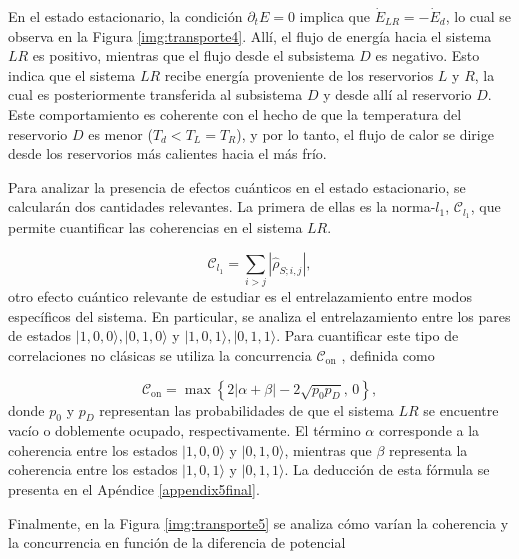En el estado estacionario, la condición \( \partial_t E = 0 \) implica que \( \dot{E}_{LR} = -\dot{E}_d \), lo cual se observa en la Figura \ref{img:transporte4}. Allí, el flujo de energía hacia el sistema \( LR \) es positivo, mientras que el flujo desde el subsistema \( D \) es negativo. Esto indica que el sistema \( LR \) recibe energía proveniente de los reservorios \( L \) y \( R \), la cual es posteriormente transferida al subsistema \( D \) y desde allí al reservorio \( D \). Este comportamiento es coherente con el hecho de que la temperatura del reservorio \( D \) es menor (\( T_{d} < T_{L} = T_{R} \)), y por lo tanto, el flujo de calor se dirige desde los reservorios más calientes hacia el más frío.

Para analizar la presencia de efectos cuánticos en el estado estacionario, se calcularán dos cantidades relevantes. La primera de ellas es la norma-\( l_{1} \), \( \mathcal{C}_{l_{1}} \), que permite cuantificar las coherencias en el sistema \( LR \).


\begin{equation*}
    \mathcal{C}_{l_{1}} = \sum_{i> j} |\hat{\rho}_{S;i,j}|,
\end{equation*}
otro efecto cuántico relevante de estudiar es el entrelazamiento entre modos específicos del sistema. En particular, se analiza el entrelazamiento entre los pares de estados \(|1,0,0\rangle, |0,1,0\rangle\) y \(|1,0,1\rangle, |0,1,1\rangle\). Para cuantificar este tipo de correlaciones no clásicas se utiliza la concurrencia \( \mathcal{C}_{\text{on}} \) \cite{hill1997entanglement, wootters1998entanglement}, definida como

\begin{equation*}
    \mathcal{C}_{\text{on}} = \max \left\{ 2|\alpha + \beta| - 2\sqrt{p_0 p_D},\, 0 \right\},
\end{equation*}
donde \( p_0 \) y \( p_D \) representan las probabilidades de que el sistema \( LR \) se encuentre vacío o doblemente ocupado, respectivamente. El término \( \alpha \) corresponde a la coherencia entre los estados \(|1,0,0\rangle\) y \(|0,1,0\rangle\), mientras que \( \beta \) representa la coherencia entre los estados \(|1,0,1\rangle\) y \(|0,1,1\rangle\). La deducción de esta fórmula se presenta en el Apéndice \ref{appendix5final}. 

Finalmente, en la Figura \ref{img:transporte5} se analiza cómo varían la coherencia y la concurrencia en función de la diferencia de potencial

    

